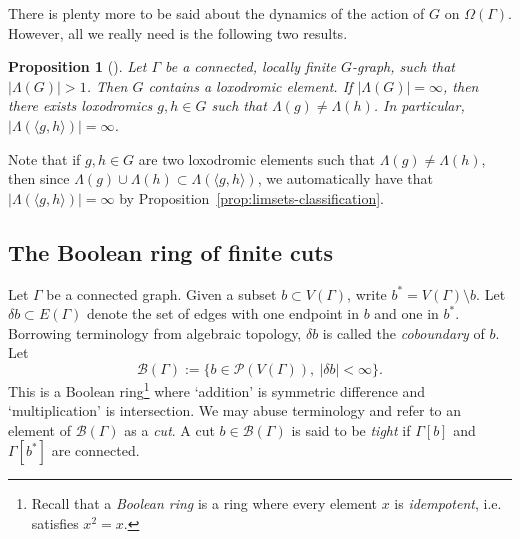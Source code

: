 \documentclass[11pt,a4paper]{amsart}
\newtheorem{proposition}[theorem]{Proposition}
\theoremstyle{definition}
\newcommand{\br}{{\mathscr{B}}}
\begin{document}
There is plenty more to be said about the dynamics of the action of $G$ on $\Omega(\Gamma)$. However, all we really need is the following two results.

\begin{proposition}[{\cite[Prop.~20.9(2)]{woess2000random}}]\label{prop:independent-lox}
    Let $\Gamma$ be a connected, locally finite $G$-graph, such that $|\Lambda(G)| > 1$. Then $G$ contains a loxodromic element. 
    If $|\Lambda(G)| = \infty$, then there exists loxodromics $g, h \in G$ such that $\Lambda(g) \neq \Lambda(h)$. In particular, $|\Lambda(\langle g,h\rangle)| = \infty$.
\end{proposition}

Note that if $g, h \in G$ are two loxodromic elements such that $\Lambda(g) \neq \Lambda(h)$, then since $\Lambda(g) \cup \Lambda(h) \subset \Lambda(\langle g,h\rangle)$, we automatically have that $|\Lambda(\langle g,h\rangle)| = \infty$ by Proposition~\ref{prop:limsets-classification}.






\subsection{The Boolean ring of finite cuts}

Let $\Gamma$ be a connected graph. Given a subset $b \subset V(\Gamma)$, write $b^\ast = V(\Gamma) \setminus b$. Let $\delta b \subset E(\Gamma)$ denote the set of edges with one endpoint in $b$ and one in $b^\ast$. Borrowing terminology from algebraic topology, $\delta b$ is called the \emph{coboundary} of $b$. Let 
$$
\br (\Gamma) := \{b \in \mathscr P(V(\Gamma)), \ |\delta b| < \infty\}.
$$
This is a Boolean ring\footnote{Recall that a \emph{Boolean ring} is a ring where every element $x$ is \emph{idempotent}, i.e. satisfies $x^2 = x$.} where `addition' is symmetric difference and `multiplication' is intersection. 
We may abuse terminology and refer to an element of $\br(\Gamma)$ as a \emph{cut}. A cut $b \in \br(\Gamma)$ is said to be \emph{tight} if $\Gamma[b]$ and $\Gamma[b^\ast]$ are connected. 
\end{document}
